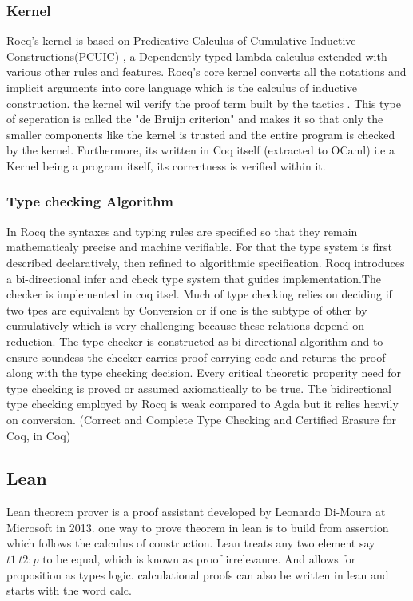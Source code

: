 \documentclass[12pt]{article}
\begin{document}
    \subsubsection{Kernel}

    Rocq's kernel is based on Predicative Calculus of Cumulative Inductive Constructions(PCUIC) , a Dependently typed lambda calculus extended with various other rules and features. Rocq's core kernel converts all the notations and implicit arguments into core language which is the calculus of inductive construction. 
    the kernel wil verify the proof term built by the tactics . This type of seperation is called the "de Bruijn criterion" and makes it so that only the smaller components
    like the kernel is trusted and the entire program is checked by the kernel. Furthermore, its written in Coq itself (extracted to OCaml) i.e a Kernel being a program itself, its correctness is verified within it.

\subsubsection{Type checking Algorithm }
        In Rocq the syntaxes and typing rules are specified so that they remain mathematicaly precise and machine verifiable. For that the type system is first described declaratively, then refined to
        algorithmic specification. Rocq introduces a bi-directional infer and check type system that guides implementation.The checker is implemented in coq itsel. Much of type checking relies on deciding if two tpes are equivalent by Conversion or if one is the subtype of 
        other by cumulatively which is very challenging because these relations depend on reduction. The type checker is constructed as bi-directional algorithm and to ensure soundess the checker carries proof carrying code and returns the proof along with 
        the type checking decision. Every critical theoretic properity need for type checking is proved or assumed axiomatically to be true. The bidirectional type checking employed by Rocq is weak compared to Agda but it relies heavily on conversion. (Correct and Complete Type Checking and Certified Erasure for Coq, in Coq)



\subsection{Lean} 
Lean theorem prover is a proof assistant developed by Leonardo Di-Moura at Microsoft in 2013. one way to prove theorem in lean is to 
build from assertion which follows the calculus of construction. Lean treats any two element say 
$ t1 \ t2: p $ to be equal, which is known as proof irrelevance. And allows for proposition as types logic. calculational proofs can also be written in lean and starts 
with the word calc. 
\end{document}
